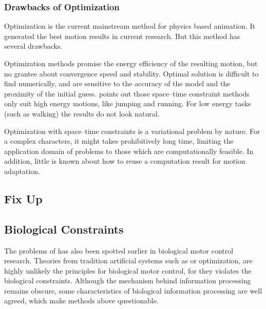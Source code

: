 \subsubsection*{Drawbacks of Optimization}
Optimization is the current mainstream method for physics based animation.
It generated the best motion results in current research.
But this method has several drawbacks.

\begin{itemize}
Optimization methods promise the energy efficiency of the resulting motion, but no grantee about convergence speed and stability.
Optimal solution is difficult to find numerically, and are sensitive to the accuracy of the model and the proximity of the initial guess.
\citet{Liu2005} points out those space–time constraint methods only suit high energy motions, like jumping and running.
For low energy tasks (such as walking) the results do not look natural.

Optimization with space–time constraints is a variational problem by nature. 
For a complex characters, it might takes  prohibitively long time, limiting the application domain of problems to those which are computationally feasible. 
In addition, little is known about how to reuse a computation result for motion adaptation.
\end{itemize}


\subsection{Fix Up}




\subsection{Biological Constraints}
The problems of \cms has also been spotted earlier in biological motor control research.
Theories from tradition artificial systems such as \pd or optimization, are highly unlikely the principles for biological motor control, for they  violates the biological constraints.
Although the mechanism behind information processing remains obscure, some characteristics of biological information processing are well agreed, which make  \cms methods above questionable\citep{Glynn2003}. 
  
